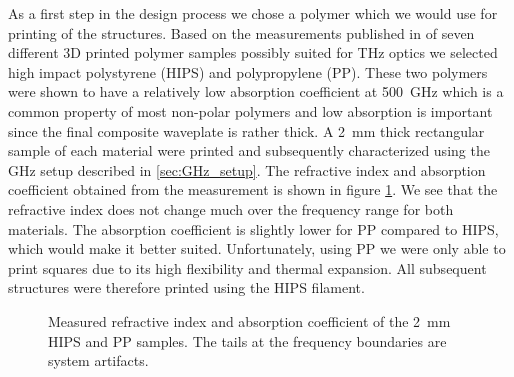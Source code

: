 As a first step in the design process we chose a polymer which we would use for printing of the structures. Based on the measurements published in \cite{Busch2014} of seven different 3D printed polymer samples possibly suited for THz optics we selected high impact polystyrene (HIPS) and polypropylene (PP). These two polymers were shown to have a relatively low absorption coefficient at \SI{500}{\giga \hertz} which is a common property of most non-polar polymers \cite{Jordens2010, Castro-Camus2020} and low absorption is important since the final composite waveplate is rather thick. A \SI{2}{\milli \meter} thick rectangular sample of each material were printed and subsequently characterized using the GHz setup described in \ref{sec:GHz_setup}. The refractive index and absorption coefficient obtained from the measurement is shown in figure \ref{fig:HIPS_PP_ri}. We see that the refractive index does not change much over the frequency range for both materials. The absorption coefficient is slightly lower for PP compared to HIPS, which would make it better suited. Unfortunately, using PP we were only able to print squares due to its high flexibility and thermal expansion. All subsequent structures were therefore printed using the HIPS filament.

\begin{figure}[H]
    \centering
    
    \caption{Measured refractive index and absorption coefficient of the \SI{2}{\milli \meter} HIPS and PP samples. The tails at the frequency boundaries are system artifacts.}
    \label{fig:HIPS_PP_ri}
\end{figure}


